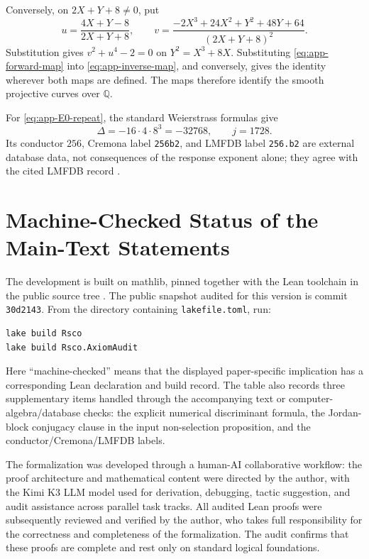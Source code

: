 \documentclass[11pt,reqno]{amsart}
\theoremstyle{remark}
\newcommand{\Q}{\mathbb Q}
\begin{document}
Conversely, on $2X+Y+8\ne0$, put
\begin{equation}\label{eq:app-inverse-map}
 u=\frac{4X+Y-8}{2X+Y+8},
 \qquad
 v=\frac{-2X^3+24X^2+Y^2+48Y+64}{(2X+Y+8)^2}.
\end{equation}
Substitution gives $v^2+u^4-2=0$ on
$Y^2=X^3+8X$.  Substituting
\eqref{eq:app-forward-map} into \eqref{eq:app-inverse-map}, and conversely,
gives the identity wherever both maps are defined.  The maps therefore
identify the smooth projective curves over $\Q$.

For \eqref{eq:app-E0-repeat}, the standard Weierstrass formulas
\cite{Silverman2009} give
\begin{equation}\label{eq:app-E0-invariants}
 \Delta=-16\cdot4\cdot8^3=-32768,
 \qquad j=1728.
\end{equation}
Its conductor $256$, Cremona label \texttt{256b2}, and LMFDB label
\texttt{256.b2} are external database data, not consequences of the response
exponent alone; they agree with the cited LMFDB record \cite{LMFDB256b2}.

\section{Machine-Checked Status of the Main-Text Statements}
\label{app:lean}

The development is built on mathlib, pinned together with the Lean
toolchain in the public source tree \cite{leanformalizations}.  The public
snapshot audited for this version is commit \texttt{30d2143}.  From the
directory containing \texttt{lakefile.toml}, run:
\begin{verbatim}
lake build Rsco
lake build Rsco.AxiomAudit
\end{verbatim}

Here ``machine-checked'' means that the displayed paper-specific implication
has a corresponding Lean declaration and build record.  The table also
records three supplementary items handled through the accompanying text or
computer-algebra/database checks: the explicit numerical discriminant
formula, the Jordan-block conjugacy clause in the input non-selection
proposition, and the conductor/Cremona/LMFDB labels.

The formalization was developed through a human-AI collaborative workflow:
the proof architecture and mathematical content were directed by the
author, with the Kimi K3 LLM model used for derivation, debugging, tactic
suggestion, and audit assistance across parallel task tracks.  All audited
Lean proofs were subsequently reviewed and verified by the author, who takes full
responsibility for the correctness and completeness of the formalization.
The audit confirms that these proofs are complete and rest only on standard
logical foundations.
\end{document}
